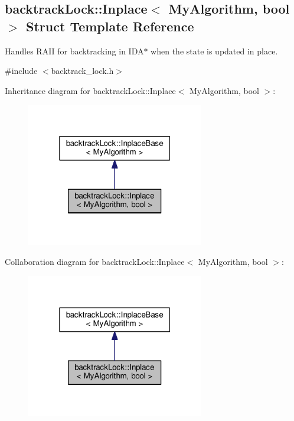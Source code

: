 \hypertarget{structbacktrackLock_1_1Inplace}{}\subsection{backtrack\+Lock\+:\+:Inplace$<$ My\+Algorithm, bool $>$ Struct Template Reference}
\label{structbacktrackLock_1_1Inplace}


Handles R\+A\+II for backtracking in I\+D\+A$\ast$ when the state is updated in place.  




{\ttfamily \#include $<$backtrack\+\_\+lock.\+h$>$}



Inheritance diagram for backtrack\+Lock\+:\+:Inplace$<$ My\+Algorithm, bool $>$\+:\nopagebreak
\begin{figure}[H]
\begin{center}
\leavevmode
\includegraphics[width=220pt]{structbacktrackLock_1_1Inplace__inherit__graph}
\end{center}
\end{figure}


Collaboration diagram for backtrack\+Lock\+:\+:Inplace$<$ My\+Algorithm, bool $>$\+:\nopagebreak
\begin{figure}[H]
\begin{center}
\leavevmode
\includegraphics[width=220pt]{structbacktrackLock_1_1Inplace__coll__graph}
\end{center}
\end{figure}
